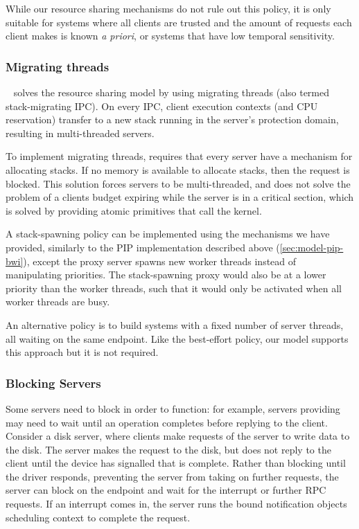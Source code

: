 While our resource sharing mechanisms do not rule out this policy, it is only suitable for
systems where all clients are trusted and the amount of requests each client makes is known \emph{a
priori}, or systems that have low temporal sensitivity.

\subsubsection{Migrating threads}

\composite~\citep{Parmer_10} solves the resource sharing model by using migrating 
threads (also termed stack-migrating IPC).
On every IPC, client execution contexts (and CPU reservation) transfer to a new stack running in the
server's protection domain, resulting in multi-threaded servers.

To implement migrating threads, \composite requires that every server have a mechanism for allocating stacks.
If no memory is available to allocate stacks, then the request is blocked.
This solution forces servers to be multi-threaded, and does not solve the problem of a clients budget expiring while the server is in a critical section, which is solved by providing atomic primitives that call the kernel.

A stack-spawning policy can be implemented using the mechanisms we have provided, similarly to
the \gls{PIP} implementation described above (\cref{sec:model-pip-bwi}), except the proxy
server spawns new worker threads instead of manipulating priorities. 
The stack-spawning proxy would also be at a lower priority than the worker threads, 
such that it would only be activated when all worker threads are busy.

An alternative policy is to build systems with a fixed number of server threads, all waiting on the
same endpoint. 
Like the best-effort policy, our model supports this approach but it is not required.

\subsubsection{Blocking Servers}

Some servers need to block in order to function: for example, servers providing \IO may need to wait
until an operation completes before replying to the client. Consider a disk server, where
clients make requests of the server to write data to the disk. The server makes the request to the
disk, but does not reply to the client until the device has signalled that \IO is complete. Rather
than blocking until the driver responds, preventing the server from taking on further requests, the
server can block on the endpoint and wait for the interrupt or further RPC requests. If an interrupt
comes in, the server runs the bound notification objects scheduling context to complete the
request.


